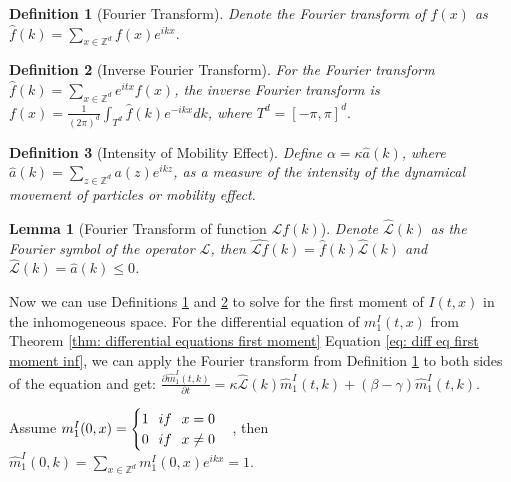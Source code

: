 \documentclass[sn-basic]{sn-jnl}%
\theoremstyle{thmstyleone}%
\theoremstyle{thmstyletwo}%
\newtheorem{lemma}{Lemma}
\theoremstyle{thmstylethree}%
\newtheorem{definition}{Definition}%
\numberwithin{equation}{theorem}
\begin{document}
\begin{definition}[Fourier Transform] \label{def: fourier transform} Denote the Fourier transform of $f(x)$ as
$\displaystyle \hat{f}(k) = \sum\limits_{x \in \mathbb{Z}^d} f(x)e^{\displaystyle ikx}.$
\end{definition}

\begin{definition}[Inverse Fourier Transform] \label{def: inverse fourier transform}
For the Fourier transform $\hat{f}(k) = \sum\limits_{x \in \mathbb{Z}^d} e^{\displaystyle itx} f(x)$, the inverse Fourier transform is $f(x)= \displaystyle \frac{1}{(2 \pi)^{d}} \int_{T^d} \hat{f}(k) e^{\displaystyle -ikx}dk$, where $T^{d} = [- \pi, \pi]^{d}.$
\end{definition}

\begin{definition}[Intensity of Mobility Effect] \label{def: intensity of mobility}
Define $ \alpha=\kappa \hat{a}(k)$, where\\
$\hat{a}(k) = \sum\limits_{z \in \mathbb{Z}^{d}} a(z)e^{\displaystyle ikz}$, as a measure of the intensity of the dynamical movement of particles or mobility effect.
\end{definition}

\begin{lemma}[Fourier Transform of function $\mathcal{L}f(k)$] \label{lemma: fourier transform of L}
Denote $\hat{\mathcal{L}}(k)$ as the Fourier symbol of the operator $\mathcal{L}$, then $\widehat{\mathcal{L}f}(k) = \hat{f}(k)\hat{\mathcal{L}}(k)$ and $\hat{\mathcal{L}}(k) = \hat{a}(k) \le 0$.
\end{lemma}
   

Now we can use Definitions \ref{def: fourier transform} and \ref{def: inverse fourier transform} to solve for the first moment of $I(t,x)$ in the inhomogeneous space. For the differential equation of $m_{1}^{I}(t,x)$ from Theorem \ref{thm: differential equations first moment} Equation \eqref{eq: diff eq first moment inf}, we can apply the Fourier transform from Definition \ref{def: fourier transform} to both sides of the equation and get:
$\displaystyle \frac{\partial \hat{m}_{1}^{I}(t,k)}{\partial t} = \kappa \hat{\mathcal{L}}(k) \hat{m}_{1}^{I}(t,k) + (\beta - \gamma) \hat{m}_{1}^{I}(t,k)$.

Assume $m_{1}^{I}(0,x) =
\begin{cases}
1 \hspace{.25cm} if \hspace{.25cm} x=0\\
0 \hspace{.25cm} if \hspace{.25cm} x \neq 0
\end{cases}$, then $\hat{m}_{1}^{I}(0,k) = \sum\limits_{x \in \mathbb{Z}^d} m_{1}^{I}(0,x) e^{\displaystyle ikx} = 1$.
\end{document}
